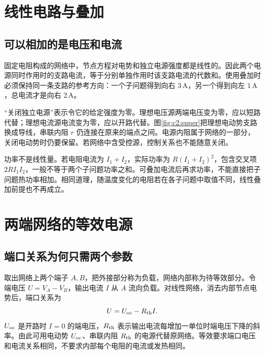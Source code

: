 \section{线性电路与叠加}
\subsection{可以相加的是电压和电流}

固定电阻构成的网络中，节点方程对电势和独立电源强度都是线性的。因此两个电源同时作用时的支路电流，等于分别单独作用时该支路电流的代数和。使用叠加时必须保持同一条支路的参考方向：一个子问题得到向右 $3\,\mathrm A$，另一个得到向左 $1\,\mathrm A$，总电流才是向右 $2\,\mathrm A$。

“关闭独立电源”表示令它的给定强度为零。理想电压源两端电压变为零，应以短路代替；理想电流源电流变为零，应以开路代替。图\ref{fig:c2:super}把理想电动势支路换成导线，串联内阻 $r$ 仍连接在原来的端点之间。电源内阻属于网络的一部分，关闭电动势时仍要保留。若网络中含受控源，控制关系也不能随意关闭。

功率不是线性量。若电阻电流为 $I_1+I_2$，实际功率为 $R(I_1+I_2)^2$，包含交叉项 $2RI_1I_2$，一般不等于两个子问题功率之和。可叠加电流后再求功率，不能直接把子问题热功率相加。相同道理，随温度变化的电阻若在各子问题中取值不同，线性叠加前提也不再成立。


\section{两端网络的等效电源}
\subsection{端口关系为何只需两个参数}

取出网络上两个端子 $A,B$，把外接部分称为负载，网络内部称为待等效部分。令端电压 $U=V_A-V_B$，输出电流 $I$ 从 $A$ 流向负载。对线性网络，消去内部节点电势后，端口关系为
\[
 U=U_{\rm oc}-R_{\rm th}I.
\]
$U_{\rm oc}$ 是开路时 $I=0$ 的端电压，$R_{\rm th}$ 表示输出电流每增加一单位时端电压下降的斜率。由此可用电动势 $U_{\rm oc}$、串联内阻 $R_{\rm th}$ 的电源代替原网络。等效要求端口电压和电流关系相同，不要求内部每个电阻的电流或发热相同。

